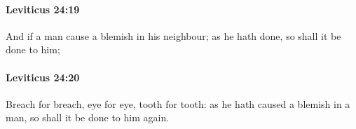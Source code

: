 		\paragraph{Leviticus 24:19} %
			\label{LEVITICUS-24-19}

			And if a man cause a blemish in his neighbour; as he hath done, so shall it be done to him;


		\paragraph{Leviticus 24:20} %
			\label{LEVITICUS-24-20}

			Breach for breach, eye for eye, tooth for tooth: as he hath caused a blemish in a man, so shall it be done to him again.


